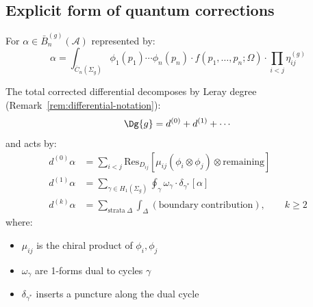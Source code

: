 \subsection{Explicit form of quantum corrections}

\begin{theorem}
\label{thm:concrete-quantum-differential}
For $\alpha \in \bar{B}^{(g)}_n(\mathcal{A})$ represented by:
\begin{equation}
\alpha = \int_{\overline{C}_n(\Sigma_g)} \phi_1(p_1) \cdots \phi_n(p_n) \cdot f(p_1, \ldots, p_n; \Omega) \cdot \prod_{i<j} \eta_{ij}^{(g)}
\end{equation}

The total corrected differential decomposes by Leray degree
\textup{(}Remark~\textup{\ref{rem:differential-notation})}:
\[
\Dg{g} = d^{(0)} + d^{(1)} + \cdots
\]
and acts by:
\begin{align}
d^{(0)}\alpha &= \sum_{i<j} \mathrm{Res}_{D_{ij}} [\mu_{ij}(\phi_i \otimes \phi_j) \otimes \mathrm{remaining}]\\
d^{(1)}\alpha &= \sum_{\gamma \in H_1(\Sigma_g)} \oint_\gamma \omega_\gamma \cdot \delta_{\gamma^*}[\alpha]\\
d^{(k)}\alpha &= \sum_{\mathrm{strata}\; \Delta} \int_\Delta \mathrm{(boundary\; contribution)}, \qquad k \ge 2
\end{align}
where:
\begin{itemize}
\item $\mu_{ij}$ is the chiral product of $\phi_i, \phi_j$
\item $\omega_\gamma$ are 1-forms dual to cycles $\gamma$
\item $\delta_{\gamma^*}$ inserts a puncture along the dual cycle
\end{itemize}
\end{theorem}

